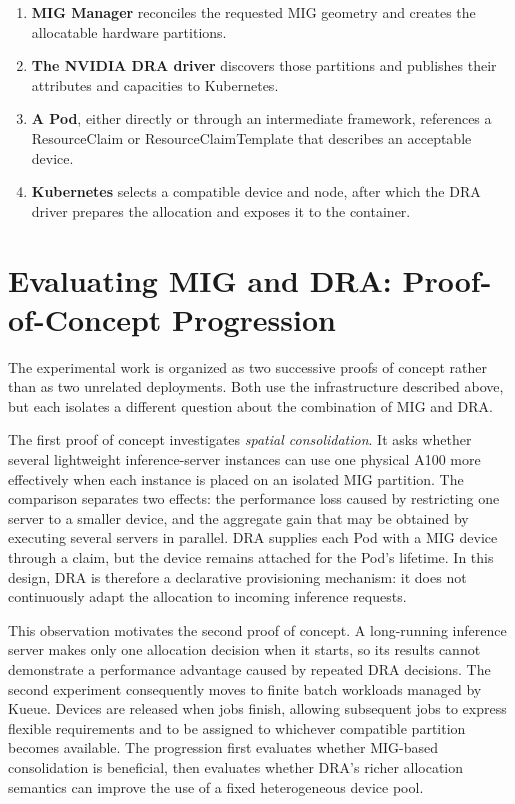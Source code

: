 \begin{enumerate}
    \item \textbf{MIG Manager} reconciles the requested MIG geometry and creates the allocatable hardware partitions.
    \item \textbf{The NVIDIA DRA driver} discovers those partitions and publishes their attributes and capacities to Kubernetes.
    \item \textbf{A Pod}, either directly or through an intermediate framework, references a ResourceClaim or ResourceClaimTemplate that describes an acceptable device.
    \item \textbf{Kubernetes} selects a compatible device and node, after which the DRA driver prepares the allocation and exposes it to the container.
\end{enumerate}

\section{Evaluating MIG and DRA: Proof-of-Concept Progression}
\label{sec:poc-progression}

The experimental work is organized as two successive proofs of concept rather than as two unrelated deployments. Both use the infrastructure described above, but each isolates a different question about the combination of MIG and DRA.

The first proof of concept investigates \emph{spatial consolidation}. It asks whether several lightweight inference-server instances can use one physical A100 more effectively when each instance is placed on an isolated MIG partition. The comparison separates two effects: the performance loss caused by restricting one server to a smaller device, and the aggregate gain that may be obtained by executing several servers in parallel. DRA supplies each Pod with a MIG device through a claim, but the device remains attached for the Pod's lifetime. In this design, DRA is therefore a declarative provisioning mechanism: it does not continuously adapt the allocation to incoming inference requests.

This observation motivates the second proof of concept. A long-running inference server makes only one allocation decision when it starts, so its results cannot demonstrate a performance advantage caused by repeated DRA decisions. The second experiment consequently moves to finite batch workloads managed by Kueue. Devices are released when jobs finish, allowing subsequent jobs to express flexible requirements and to be assigned to whichever compatible partition becomes available. The progression first evaluates whether MIG-based consolidation is beneficial, then evaluates whether DRA's richer allocation semantics can improve the use of a fixed heterogeneous device pool.

